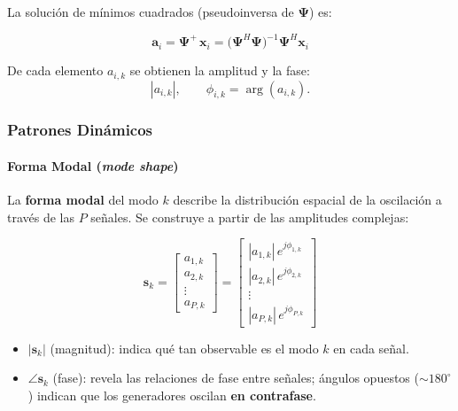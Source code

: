 \documentclass{beamer}
\begin{document}
\begin{frame}
    
La solución de mínimos cuadrados (pseudoinversa de $\boldsymbol{\Psi}$) es:

\begin{equation}
    \mathbf{a}_i = \boldsymbol{\Psi}^+\,\mathbf{x}_i
    = \bigl(\boldsymbol{\Psi}^H\boldsymbol{\Psi}\bigr)^{-1}\boldsymbol{\Psi}^H\mathbf{x}_i
    \label{eq:residues_art}
\end{equation}

De cada elemento $a_{i,k}$ se obtienen la amplitud y la fase:
\[
|a_{i,k}|,\qquad \phi_{i,k} = \arg(a_{i,k}).
\]
\end{frame}
\begin{frame}
\frametitle{Patrones Dinámicos}
\framesubtitle{Forma Modal (\textit{mode shape})}

La \textbf{forma modal} del modo $k$ describe la distribución espacial de la oscilación
a través de las $P$ señales. Se construye a partir de las amplitudes complejas:

\begin{equation}
    \mathbf{s}_k =
    \begin{bmatrix}
        a_{1,k} \\
        a_{2,k} \\
        \vdots \\
        a_{P,k}
    \end{bmatrix}
    =
    \begin{bmatrix}
        |a_{1,k}|\,e^{j\phi_{1,k}} \\
        |a_{2,k}|\,e^{j\phi_{2,k}} \\
        \vdots \\
        |a_{P,k}|\,e^{j\phi_{P,k}}
    \end{bmatrix}
    \label{eq:mode_shape_art}
\end{equation}

\begin{itemize}
    \item $|\mathbf{s}_k|$ (magnitud): indica qué tan observable es el modo $k$ en cada señal.
    \item $\angle\mathbf{s}_k$ (fase): revela las relaciones de fase entre señales;
          ángulos opuestos ($\sim 180^\circ$) indican que los generadores oscilan \textbf{en contrafase}.
\end{itemize}

\end{frame}


\end{document}
